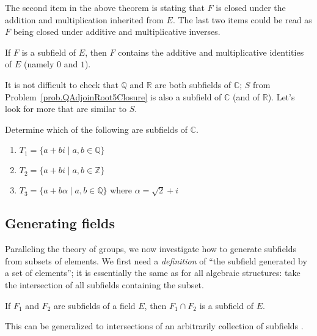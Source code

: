 The second item in the above theorem is stating that $F$ is closed under the addition and multiplication inherited from $E$. The last two items could be read as $F$ being closed under additive and multiplicative inverses.

\begin{theorem}\label{thm.SubfieldContains01}
If $F$ is a subfield of $E$, then $F$ contains the additive and multiplicative identities of $E$ (namely $0$ and $1$).
\end{theorem}

It is not difficult to check that $\mathbb{Q}$ and $\mathbb{R}$ are both subfields of $\mathbb{C}$; $S$ from Problem~\ref{prob.QAdjoinRoot5Closure} is also a subfield of $\mathbb{C}$ (and of $\mathbb{R}$). Let's look for more that are similar to $S$.

\begin{problem}\label{prob.SubfieldRoot2PlusI}
Determine which of the following are subfields of $\mathbb{C}$.
\begin{enumerate}
\item\label{prob.SubfieldRoot2PlusI.QAdjoinI} $T_1=\{a+bi\mid a,b\in \mathbb{Q}\}$
\item $T_2=\{a+bi\mid a,b\in \mathbb{Z}\}$
\item\label{prob.SubfieldRoot2PlusI.QAdjoinRoot2PlusI} $T_3=\{a+b\alpha\mid a,b\in \mathbb{Q}\}$ where  $\alpha = \sqrt{2} + i$
\end{enumerate}
\end{problem}


\subsection{Generating fields}
Paralleling the theory of groups, we now investigate how to generate subfields from subsets of elements. We first need a \emph{definition} of ``the subfield generated by a set of elements'';  it is essentially the same as for all algebraic structures: take the intersection of all subfields containing the subset.

\begin{theorem}\label{thm.IntersectFields}
If $F_1$ and $F_2$ are subfields of a field $E$, then $F_1\cap F_2$ is a subfield of $E$.
\end{theorem}

This can be generalized to intersections of an arbitrarily collection of subfields . 

